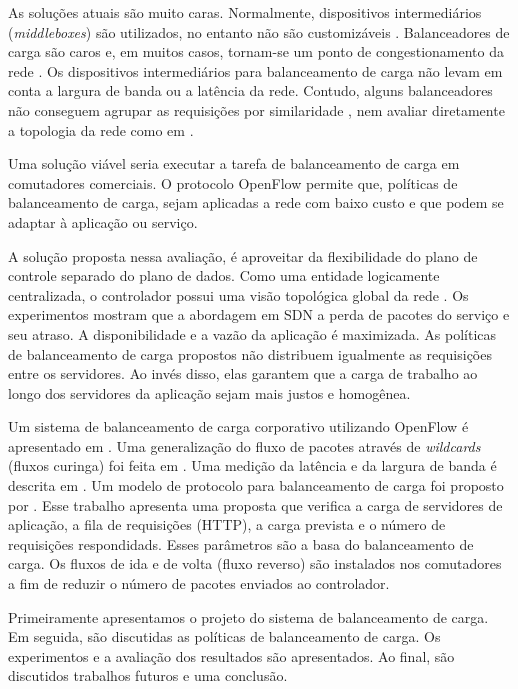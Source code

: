 As soluções atuais são muito caras. 
Normalmente, dispositivos intermediários (\emph{middleboxes}) são utilizados,
no entanto não são customizáveis \citep{richard2011openflow}.
Balanceadores de carga são caros e, em muitos casos, tornam-se um ponto de 
congestionamento da rede \citep{nikhil2010asterix}.
Os dispositivos intermediários para balanceamento de carga não levam em conta
a largura de banda ou a latência da rede.
Contudo, alguns balanceadores não conseguem agrupar as requisições por 
similaridade \citep{richard2011openflow}, nem avaliar diretamente a topologia
da rede como em \citep{nikhil2009plugnserve}.


Uma solução viável seria executar a tarefa de balanceamento de carga em 
comutadores comerciais.
O protocolo OpenFlow permite que, políticas de balanceamento de carga, sejam
aplicadas a rede com baixo custo e que podem se adaptar à aplicação ou serviço.

A solução proposta nessa avaliação, é aproveitar da flexibilidade do plano de
controle separado do plano de dados.
Como uma entidade logicamente centralizada, o controlador possui uma visão 
topológica global da rede \citep{nick2008openflow}.
Os experimentos mostram que a abordagem em SDN a perda de pacotes do serviço
e seu atraso.
A disponibilidade e a vazão da aplicação é maximizada.
As políticas de balanceamento de carga propostos não distribuem igualmente as 
requisições entre os servidores. 
Ao invés disso, elas garantem que a carga de trabalho ao longo dos servidores
da aplicação sejam mais justos e homogênea.

Um sistema de balanceamento de carga corporativo utilizando OpenFlow é 
apresentado em \citep{nikhil2009plugnserve}.
Uma generalização do fluxo de pacotes através de \emph{wildcards} (fluxos
curinga) foi feita em \citep{richard2011openflow}.
Uma medição da latência e da largura de banda é descrita em 
\citep{hardeep2010openflow}.
Um modelo de protocolo para balanceamento de carga foi proposto por 
\citep{charalampos2013modelling}.
Esse trabalho apresenta uma proposta que verifica a carga de servidores de 
aplicação, a fila de requisições (HTTP), a carga prevista e o número de 
requisições respondidads.
Esses parâmetros são a basa do balanceamento de carga. 
Os fluxos de ida e de volta (fluxo reverso) são instalados nos comutadores a
fim de reduzir o número de pacotes enviados ao controlador.

Primeiramente apresentamos o projeto do sistema de balanceamento de carga.
Em seguida, são discutidas as políticas de balanceamento de carga.
Os experimentos e a avaliação dos resultados são apresentados.
Ao final, são discutidos trabalhos futuros e uma conclusão.

